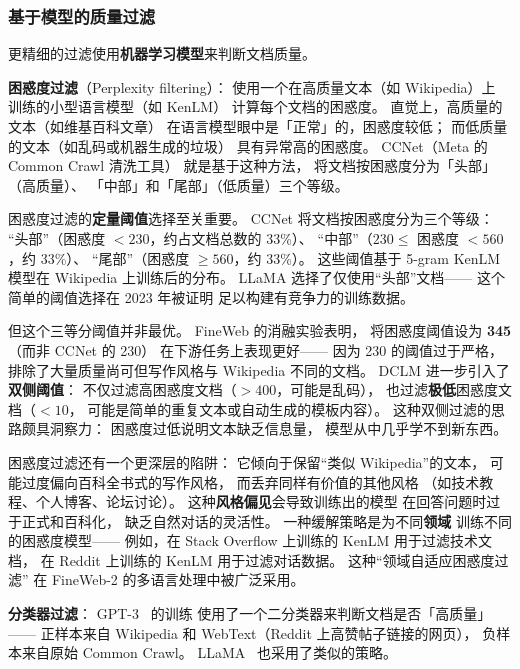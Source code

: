\subsubsection{基于模型的质量过滤}

更精细的过滤使用\textbf{机器学习模型}来判断文档质量。

\textbf{困惑度过滤}（Perplexity filtering）：
使用一个在高质量文本（如 Wikipedia）上
训练的小型语言模型（如 KenLM）
计算每个文档的困惑度。
直觉上，高质量的文本（如维基百科文章）
在语言模型眼中是「正常」的，困惑度较低；
而低质量的文本（如乱码或机器生成的垃圾）
具有异常高的困惑度。
CCNet（Meta 的 Common Crawl 清洗工具）
就是基于这种方法，
将文档按困惑度分为「头部」（高质量）、
「中部」和「尾部」（低质量）三个等级。

困惑度过滤的\textbf{定量阈值}选择至关重要。
CCNet 将文档按困惑度分为三个等级：
``头部''（困惑度 $< 230$，约占文档总数的 33\%）、
``中部''（$230 \leq$ 困惑度 $< 560$，约 33\%）、
``尾部''（困惑度 $\geq 560$，约 33\%）。
这些阈值基于 5-gram KenLM 模型在 Wikipedia 上训练后的分布。
LLaMA 选择了仅使用``头部''文档——
这个简单的阈值选择在 2023 年被证明
足以构建有竞争力的训练数据。

但这个三等分阈值并非最优。
FineWeb 的消融实验表明，
将困惑度阈值设为 \textbf{345}（而非 CCNet 的 230）
在下游任务上表现更好——
因为 230 的阈值过于严格，
排除了大量质量尚可但写作风格与 Wikipedia 不同的文档。
DCLM 进一步引入了\textbf{双侧阈值}：
不仅过滤高困惑度文档（$> 400$，可能是乱码），
也过滤\textbf{极低}困惑度文档（$< 10$，
可能是简单的重复文本或自动生成的模板内容）。
这种双侧过滤的思路颇具洞察力：
困惑度过低说明文本缺乏信息量，
模型从中几乎学不到新东西。

困惑度过滤还有一个更深层的陷阱：
它倾向于保留``类似 Wikipedia''的文本，
可能过度偏向百科全书式的写作风格，
而丢弃同样有价值的其他风格
（如技术教程、个人博客、论坛讨论）。
这种\textbf{风格偏见}会导致训练出的模型
在回答问题时过于正式和百科化，
缺乏自然对话的灵活性。
一种缓解策略是为不同\textbf{领域}
训练不同的困惑度模型——
例如，在 Stack Overflow 上训练的 KenLM
用于过滤技术文档，
在 Reddit 上训练的 KenLM
用于过滤对话数据。
这种``领域自适应困惑度过滤''
在 FineWeb-2 的多语言处理中被广泛采用。

\textbf{分类器过滤}：
GPT-3~\cite{brown2020gpt3} 的训练
使用了一个二分类器来判断文档是否「高质量」——
正样本来自 Wikipedia 和 WebText（Reddit 上高赞帖子链接的网页），
负样本来自原始 Common Crawl。
LLaMA~\cite{touvron2023llama} 也采用了类似的策略。

